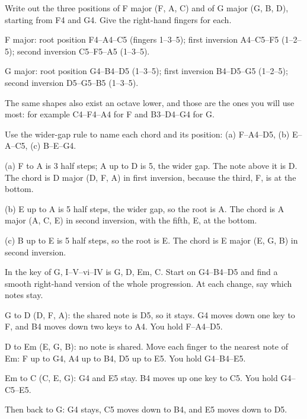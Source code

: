 \begin{exercise}
Write out the three positions of F major (F, A, C) and of G major (G, B, D), starting from F4 and G4. Give the right-hand fingers for each.
\end{exercise}

\begin{answerbox}
F major: root position F4--A4--C5 (fingers 1--3--5);  first inversion A4--C5--F5 (1--2--5);  second inversion C5--F5--A5 (1--3--5). 

G major: root position G4--B4--D5 (1--3--5);  first inversion B4--D5--G5 (1--2--5);  second inversion D5--G5--B5 (1--3--5). 

The same shapes also exist an octave lower, and those are the ones you will use most: for example C4--F4--A4 for F and B3--D4--G4 for G.
\end{answerbox}

\begin{exercise}
Use the wider-gap rule to name each chord and its position: (a) F--A4--D5, (b) E--A--C5, (c) B--E--G4.
\end{exercise}

\begin{answerbox}
(a) F\sh{} to A is 3 half steps; A up to D is 5, the wider gap. The note above it is D. The chord is D major (D, F\sh, A) in first inversion, because the third, F\sh, is at the bottom. 

(b) E\fl{} up to A\fl{} is 5 half steps, the wider gap, so the root is A\fl. The chord is A\fl{} major (A\fl, C, E\fl) in second inversion, with the fifth, E\fl, at the bottom. 

(c) B\fl{} up to E\fl{} is 5 half steps, so the root is E\fl. The chord is E\fl{} major (E\fl, G, B\fl) in second inversion. 
\end{answerbox}

\begin{exercise}
In the key of G, I--V--vi--IV is G, D, Em, C. Start on G4--B4--D5 and find a smooth right-hand version of the whole progression. At each change, say which notes stay.
\end{exercise}

\begin{answerbox}
G to D (D, F\sh, A): the shared note is D5, so it stays. G4 moves down one key to F, and B4 moves down two keys to A4. You hold F--A4--D5.

D to Em (E, G, B): no note is shared. Move each finger to the nearest note of Em: F up to G4, A4 up to B4, D5 up to E5. You hold G4--B4--E5.

Em to C (C, E, G): G4 and E5 stay. B4 moves up one key to C5. You hold G4--C5--E5.

Then back to G: G4 stays, C5 moves down to B4, and E5 moves down to D5. 
\end{answerbox}


